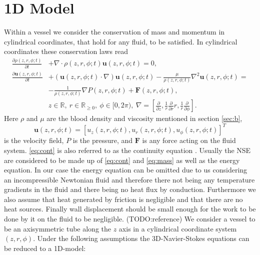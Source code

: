 \documentclass[a4paper, oneside]{discothesis}
\begin{document}
\section{1D Model} \label{sec:sv}
Within a vessel we consider the conservation of mass and momentum in cylindrical coordinates, that hold for any fluid, to be satisfied.
In cylindrical coordinates these conservation laws read
\begin{align}
	\frac{\partial \rho (z,r,\phi; t)}{\partial t} &+ \nabla \cdot \rho (z,r,\phi; t)\mathbf{u}(z,r,\phi; t) = 0, \label{eq:cont}\\
	\frac{\partial \mathbf{u}(z,r,\phi; t)}{\partial t} &+ \left( \mathbf{u}(z,r,\phi; t) \cdot \nabla \right) \mathbf{u}(z,r,\phi; t) - \frac{\mu}{\rho(z,r,\phi; t)} \nabla^2 \mathbf{u}(z,r,\phi; t) = \\
														&- \frac{1}{\rho (z,r,\phi; t)} \nabla P(z,r,\phi; t) + \mathbf{F}(z,r,\phi; t), \label{eq:mass} \\
														&z \in \mathbb{R}, \ r \in \mathbb{R}_{\geq 0}, \ \phi \in [0, 2\pi), \ \nabla = \left[\frac{\partial}{\partial z}, \frac{1}{r}\frac{\partial}{\partial r}r, \frac{1}{r}\frac{\partial}{\partial \phi}  \right].
\end{align}
Here $\rho$ and $\mu$ are the blood density and viscosity mentioned in section \ref{sec:b}, 
\begin{equation}
	\mathbf{u}(z,r,\phi; t) = \left[ u_z(z,r,\phi; t), u_r(z,r,\phi; t), u_\phi (z,r,\phi; t) \right]^T
\end{equation}
is the velocity field, $P$ is the pressure, and $\mathbf{F}$ is any force acting on the fluid system.
\autoref{eq:cont} is also referred to as the continuity equation \cite{anderson2011ebook}.
Usually the NSE are considered to be made up of \autoref{eq:cont} and \autoref{eq:mass} as well as the energy equation.
In our case the energy equation can be omitted due to us considering an incompressible Newtonian fluid and therefore there not being any temperature gradients in the fluid and there being no heat flux by conduction.
Furthermore we also assume that heat generated by friction is negligible and that there are no heat sources.
Finally wall displacement should be small enough for the work to be done by it on the fluid to be negligible. (TODO:reference)
We consider a vessel to be an axisymmetric tube along the $z$ axis in a cylindrical coordinate system $\left(z,r,\phi\right)$.
Under the following assumptions the 3D-Navier-Stokes equations can be reduced to a 1D-model:
\end{document}
